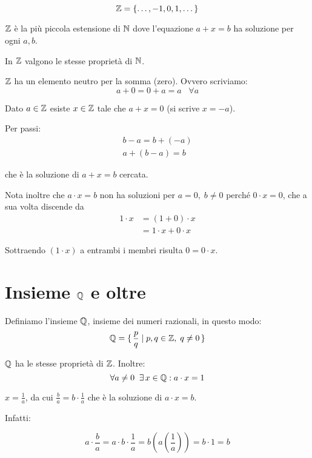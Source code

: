 \begin{equation*}
\mathbb Z = \{\dots, -1, 0, 1, \dots \}
\end{equation*}

$\mathbb Z$ è la più piccola estensione di $\mathbb N$ dove l'equazione $a+x=b$ ha soluzione per ogni $a, b$. 

In $\mathbb Z$ valgono le stesse proprietà di $\mathbb N$.

$\mathbb Z$ ha un elemento neutro per la somma (zero). Ovvero scriviamo:
\begin{equation*}
a + 0 = 0 + a = a \;\;\; \forall a
\end{equation*}

Dato $a \in \mathbb Z$ esiste $x \in \mathbb Z$ tale che $a+x=0$ (si scrive $x=-a$).

Per passi:
\begin{align*}
b - a = b + (-a) \\
a + (b-a) = b
\end{align*}

che è la soluzione di $a+x=b$ cercata.

Nota inoltre che $a \cdot x = b$ non ha soluzioni per $a=0,\;b\neq 0$ perché $0 \cdot x = 0$, che a sua volta discende da
\begin{align*}
1 \cdot x &= (1 + 0) \cdot x \\
&=1 \cdot x + 0 \cdot x
\end{align*}

Sottraendo $(1 \cdot x)$ a entrambi i membri risulta $0 = 0 \cdot x$.

\section{Insieme $\mathbb Q$ e oltre}

Definiamo l'insieme $\mathbb Q$, insieme dei numeri razionali, in questo modo:
\begin{equation*}
\mathbb Q = \set{\frac{p}{q} | p,q \in \mathbb Z,\;q \neq 0}
\end{equation*}

$\mathbb Q$ ha le stesse proprietà di $\mathbb Z$. Inoltre:
\begin{equation*}
\forall a \neq 0 \;\; \exists\, x \in \mathbb Q : a \cdot x = 1
\end{equation*}

$x = \frac{1}{a}$, da cui $\frac{b}{a} = b \cdot \frac{1}{a}$ che è la soluzione di $a \cdot x = b$. 

Infatti:

\begin{equation*}
a \cdot \frac{b}{a} = a \cdot b \cdot \frac{1}{a} = b \left(a\left(\frac{1}{a}\right)\right) = b \cdot 1 = b
\end{equation*}

